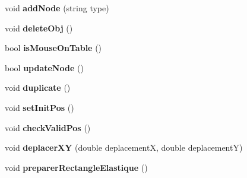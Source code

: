 \begin{DoxyCompactItemize}
\item 
\hypertarget{class_interface_graphique_1_1_engine_aa46f12913f60c43e4e41822a4ff2878e}{void {\bfseries add\-Node} (string type)}\label{class_interface_graphique_1_1_engine_aa46f12913f60c43e4e41822a4ff2878e}

\item 
\hypertarget{class_interface_graphique_1_1_engine_a2da939e4abf78842a17cb2233484be76}{void {\bfseries delete\-Obj} ()}\label{class_interface_graphique_1_1_engine_a2da939e4abf78842a17cb2233484be76}

\item 
\hypertarget{class_interface_graphique_1_1_engine_a7c87261c9f2478f881a4a52c6cb86445}{bool {\bfseries is\-Mouse\-On\-Table} ()}\label{class_interface_graphique_1_1_engine_a7c87261c9f2478f881a4a52c6cb86445}

\item 
\hypertarget{class_interface_graphique_1_1_engine_a3ce229a326130eaad8094a871c8293f5}{bool {\bfseries update\-Node} ()}\label{class_interface_graphique_1_1_engine_a3ce229a326130eaad8094a871c8293f5}

\item 
\hypertarget{class_interface_graphique_1_1_engine_ac54d12909eaa18c9291320f2543de5f4}{void {\bfseries duplicate} ()}\label{class_interface_graphique_1_1_engine_ac54d12909eaa18c9291320f2543de5f4}

\item 
\hypertarget{class_interface_graphique_1_1_engine_a5675cbf578d78cb4cfd792bfa5d3b0b8}{void {\bfseries set\-Init\-Pos} ()}\label{class_interface_graphique_1_1_engine_a5675cbf578d78cb4cfd792bfa5d3b0b8}

\item 
\hypertarget{class_interface_graphique_1_1_engine_a0eab161c6a7ea2c8b1ff0de5fc0a6385}{void {\bfseries check\-Valid\-Pos} ()}\label{class_interface_graphique_1_1_engine_a0eab161c6a7ea2c8b1ff0de5fc0a6385}

\item 
\hypertarget{class_interface_graphique_1_1_engine_ae0376cf6810633d7de94991db45a520d}{void {\bfseries deplacer\-X\-Y} (double deplacement\-X, double deplacement\-Y)}\label{class_interface_graphique_1_1_engine_ae0376cf6810633d7de94991db45a520d}

\item 
\hypertarget{class_interface_graphique_1_1_engine_a25dd642bd70ac8bd97be182e319202bd}{void {\bfseries preparer\-Rectangle\-Elastique} ()}\label{class_interface_graphique_1_1_engine_a25dd642bd70ac8bd97be182e319202bd}


\end{DoxyCompactItemize}
